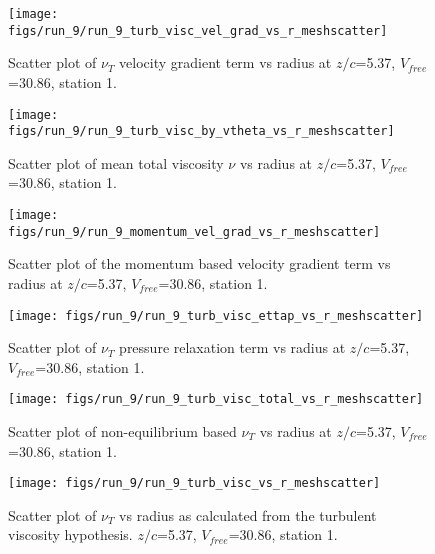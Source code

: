 \begin{figure}[H]
\centering
\texttt{[image: figs/run\_9/run\_9\_turb\_visc\_vel\_grad\_vs\_r\_meshscatter]}
\caption{Scatter plot of $\nu_T$ velocity gradient term vs radius at $z/c$=5.37, $V_{free}$=30.86, station 1.}
\end{figure}


\begin{figure}[H]
\centering
\texttt{[image: figs/run\_9/run\_9\_turb\_visc\_by\_vtheta\_vs\_r\_meshscatter]}
\caption{Scatter plot of mean total viscosity $\nu$ vs radius at $z/c$=5.37, $V_{free}$=30.86, station 1.}
\end{figure}


\begin{figure}[H]
\centering
\texttt{[image: figs/run\_9/run\_9\_momentum\_vel\_grad\_vs\_r\_meshscatter]}
\caption{Scatter plot of the momentum based velocity gradient term vs radius at $z/c$=5.37, $V_{free}$=30.86, station 1.}
\end{figure}


\begin{figure}[H]
\centering
\texttt{[image: figs/run\_9/run\_9\_turb\_visc\_ettap\_vs\_r\_meshscatter]}
\caption{Scatter plot of $\nu_T$ pressure relaxation term vs radius at $z/c$=5.37, $V_{free}$=30.86, station 1.}
\end{figure}


\begin{figure}[H]
\centering
\texttt{[image: figs/run\_9/run\_9\_turb\_visc\_total\_vs\_r\_meshscatter]}
\caption{Scatter plot of non-equilibrium based $\nu_T$ vs radius at $z/c$=5.37, $V_{free}$=30.86, station 1.}
\end{figure}


\begin{figure}[H]
\centering
\texttt{[image: figs/run\_9/run\_9\_turb\_visc\_vs\_r\_meshscatter]}
\caption{Scatter plot of $\nu_T$ vs radius as calculated from the turbulent viscosity hypothesis. $z/c$=5.37, $V_{free}$=30.86, station 1.}
\end{figure}


